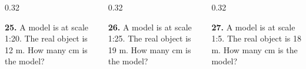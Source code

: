 \documentclass[aspectratio=169,12pt]{beamer}
\newcommand{\MMProblem}[2]{\begin{MMProblemCard}\raggedright\small\textbf{#1.} #2\par\end{MMProblemCard}}
\begin{document}
\begin{frame}[t]
\begin{center}
\end{center}
\vspace{0.05em}
\begin{columns}[T,onlytextwidth]
\begin{column}{0.32\textwidth}\MMProblem{25}{A model is at scale 1:20. The real object is 12 m. How many cm is the model?}\end{column}
\begin{column}{0.32\textwidth}\MMProblem{26}{A model is at scale 1:25. The real object is 19 m. How many cm is the model?}\end{column}
\begin{column}{0.32\textwidth}\MMProblem{27}{A model is at scale 1:5. The real object is 18 m. How many cm is the model?}\end{column}
\end{columns}
\end{frame}
\end{document}
